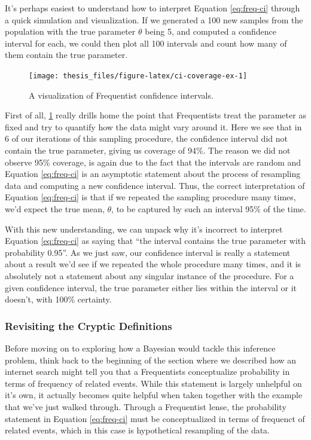 \documentclass[12pt,twoside]{reedthesis}
\begin{document}
It's perhaps easiest to understand how to interpret Equation \eqref{eq:freq-ci} through a quick simulation and visualization. If we generated a 100 new samples from the population with the true parameter \(\theta\) being 5, and computed a confidence interval for each, we could then plot all 100 intervals and count how many of them contain the true parameter.
\begin{figure}

{\centering \texttt{[image: thesis\_files/figure-latex/ci-coverage-ex-1]} 

}

\caption{A visualization of Frequentist confidence intervals.}\label{fig:ci-coverage-ex}
\end{figure}
First of all, \ref{fig:ci-coverage-ex} really drills home the point that Frequentists treat the parameter as fixed and try to quantify how the data might vary around it. Here we see that in 6 of our iterations of this sampling procedure, the confidence interval did not contain the true parameter, giving us coverage of 94\%. The reason we did not observe 95\% coverage, is again due to the fact that the intervals are random and Equation \eqref{eq:freq-ci} is an asymptotic statement about the process of resampling data and computing a new confidence interval. Thus, the correct interpretation of Equation \eqref{eq:freq-ci} is that if we repeated the sampling procedure many times, we'd expect the true mean, \(\theta\), to be captured by such an interval 95\% of the time.

With this new understanding, we can unpack why it's incorrect to interpret Equation \eqref{eq:freq-ci} as saying that ``the interval contains the true parameter with probability 0.95''. As we just saw, our confidence interval is really a statement about a result we'd see if we repeated the whole procedure many times, and it is absolutely not a statement about any singular instance of the procedure. For a given confidence interval, the true parameter either lies within the interval or it doesn't, with 100\% certainty.

\hypertarget{revisiting-the-cryptic-definitions}{%
\subsubsection{Revisiting the Cryptic Definitions}\label{revisiting-the-cryptic-definitions}}

Before moving on to exploring how a Bayesian would tackle this inference problem, think back to the beginning of the section where we described how an internet search might tell you that a Frequentists conceptualize probability in terms of frequency of related events. While this statement is largely unhelpful on it's own, it actually becomes quite helpful when taken together with the example that we've just walked through. Through a Frequentist lense, the probability statement in Equation \eqref{eq:freq-ci} must be conceptualized in terms of frequenct of related events, which in this case is hypothetical resampling of the data.
\end{document}
